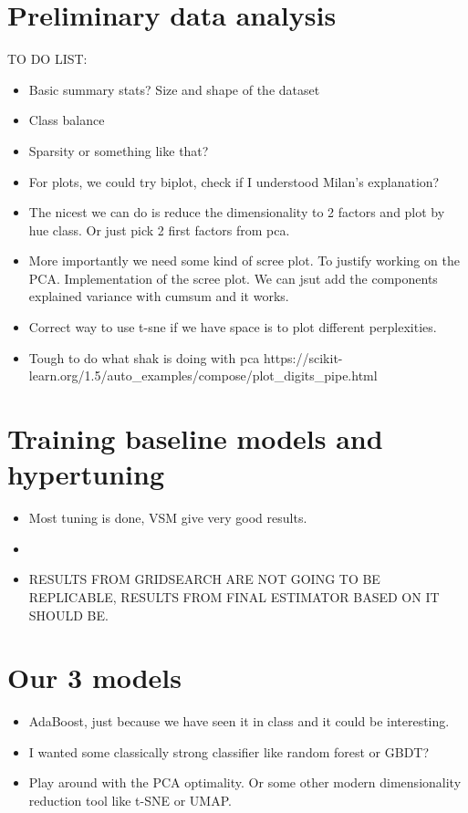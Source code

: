 \documentclass{article}
\begin{document}
\section{Preliminary data analysis}

TO DO LIST:
\begin{itemize}
    \item Basic summary stats? Size and shape of the dataset
    \item Class balance
    \item Sparsity or something like that?
    \item For plots, we could try biplot, check if I understood Milan's explanation?
    \item The nicest we can do is reduce the dimensionality to 2 factors and plot by hue class. 
    Or just pick 2 first factors from pca.
    \item More importantly we need some kind of scree plot. To justify working on the PCA. Implementation of the scree plot. We can 
    jsut add the components explained variance with cumsum and it works.
    \item Correct way to use t-sne if we have space is to plot different perplexities.
    \item Tough to do what shak is doing with pca https://scikit-learn.org/1.5/auto_examples/compose/plot_digits_pipe.html
\end{itemize}


\section{Training baseline models and hypertuning}

\begin{itemize}
    \item Most tuning is done, VSM give very good results.
    \item 
    \item RESULTS FROM GRIDSEARCH ARE NOT GOING TO BE REPLICABLE, RESULTS FROM FINAL ESTIMATOR BASED ON IT SHOULD BE.
\end{itemize}


\section{Our 3 models}

\begin{itemize}
    \item AdaBoost, just because we have seen it in class and it could be interesting.
    \item I wanted some classically strong classifier like random forest or GBDT?
    \item Play around with the PCA optimality. Or some other modern dimensionality reduction tool like t-SNE or UMAP. 
\end{itemize}

\section{}
\end{document}
